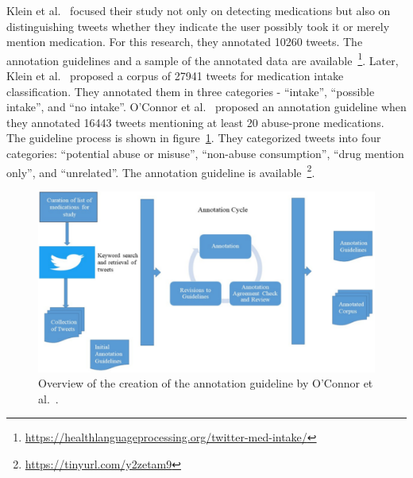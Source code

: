 Klein et al.~\cite{klein2017detecting} focused their study not only on detecting medications but also on distinguishing tweets whether they indicate the user possibly took it or merely mention medication. For this research, they annotated 10260 tweets. The annotation guidelines and a sample of the annotated data are available~\footnote{\url{https://healthlanguageprocessing.org/twitter-med-intake/}}. Later, Klein et al.~\cite{klein2019analysis} proposed a corpus of 27941 tweets for medication intake classification. They annotated them in three categories - “intake”, “possible intake”, and “no intake”. O’Connor et al.~\cite{o2020promoting} proposed an annotation guideline when they annotated 16443 tweets mentioning at least 20 abuse-prone medications. The guideline process is shown in figure~\ref{fig:annotation-oconnor}. They categorized tweets into four categories: “potential abuse or misuse”, “non-abuse consumption”, “drug mention only”, and “unrelated”. The annotation guideline is available~\footnote{\url{https://tinyurl.com/y2zetam9}}.

\begin{figure}[h]
	\centering
	\includegraphics[width=0.99\linewidth]{Figures/d.png}
	\caption{Overview of the creation of the annotation guideline by O’Connor et al.~\cite{o2020promoting}.}
	\label{fig:annotation-oconnor}
\end{figure}
